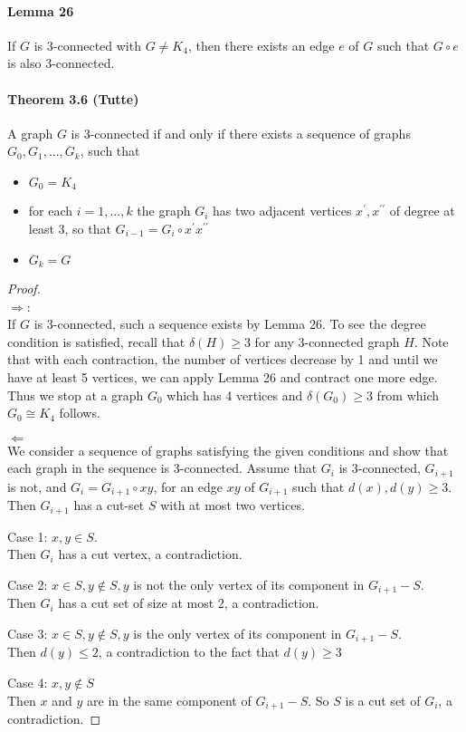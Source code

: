 \paragraph{Lemma 26} If $ G $ is 3-connected with $ G \neq K_4 $, then there exists 
an edge $ e $ of $ G $ such that $ G \circ e $ is also 3-connected.

\paragraph{Theorem 3.6 (Tutte)} A graph $ G $ is 3-connected if and only if there 
exists a sequence of graphs $ G_0,G_1,...,G_k$, such that 
\begin{itemize}
    \item $G_0 = K_4$
    \item for each $ i = 1,...,k$ the graph $ G_i $ has two adjacent vertices $ x^\prime, 
    x^{\prime\prime} $ of degree at least 3, so that $ G_{i-1} = G_i \circ 
    x^{\prime}x^{\prime\prime} $
    \item $ G_k = G$
\end{itemize}
\begin{proof} $ $ \\
    $\Rightarrow$: \\
    If $G$ is 3-connected, such a sequence exists by Lemma 26. To see the 
    degree condition is satisfied, recall that $\delta(H) \geq 3$ for any 
    3-connected graph $H$. Note that with each contraction, the number of 
    vertices decrease by 1 and until we have at least 5 vertices, we can 
    apply Lemma 26 and contract one more edge. Thus we stop at a graph
    $G_0$ which has 4 vertices and $\delta(G_0) \geq 3$ from which 
    $G_0 \cong K_4$ follows.

    \bigskip
    $\Leftarrow$ \\
    We consider a sequence of graphs satisfying the given conditions and show 
    that each graph in the sequence is 3-connected. Assume that $G_i$ is 
    3-connected, $G_{i+1}$ is not, and $G_i = G_{i+1} \circ xy$, for an edge $xy$
    of $G_{i+1}$ such that $d(x),d(y) \geq 3$. Then $G_{i+1}$ has a cut-set 
    $S$ with at most two vertices.

    \smallskip \noindent
    Case 1: $x,y \in S$. \\
    Then $G_i$ has a cut vertex, a contradiction.

    \smallskip \noindent
    Case 2: $x \in S, y \notin S, y$ is not the only vertex of its component in 
    $G_{i+1} - S$.\\
    Then $G_i$ has a cut set of size at most 2, a contradiction.

    \smallskip \noindent
    Case 3: $x \in S, y \notin S, y$ is the only vertex of its component in 
    $G_{i+1} - S$.\\
    Then $d(y) \leq 2$, a contradiction to the fact that $d(y) \geq 3$

    \smallskip \noindent
    Case 4: $x,y \notin S$\\
    Then $x$ and $y$ are in the same component of $G_{i+1} - S$. So $S$ is 
    a cut set of $G_i$, a contradiction.
\end{proof}
